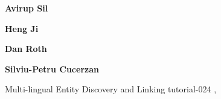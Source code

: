 \begin{bio}
{\bfseries Avirup Sil} 

{\bfseries Heng Ji}

{\bfseries Dan Roth}

{\bfseries Silviu-Petru Cucerzan}

\end{bio}

\begin{tutorial}{Multi-lingual Entity Discovery and Linking}
  {tutorial-024}
  {\daydateyear, \tutorialafternoontime}
  {\TutLocH}


\end{tutorial}

